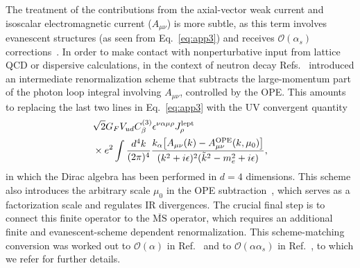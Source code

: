 \documentclass[prl,twocolumn,twoside,preprintnumbers,superscriptaddress,nofootinbib,letterpaper]{revtex4-1}
\newcommand{\Order}{\mathcal{O}}
\begin{document}
The treatment of the contributions  from  the axial-vector  weak current and  isoscalar electromagnetic current
($A_{\mu \nu}$) is more subtle, as this term  involves evanescent structures (as seen from Eq.~\eqref{eq:app3})
and receives $\Order(\alpha_s)$ corrections~\cite{Sirlin:1981ie,Gorbahn:2025ssv}.
In order to make contact with nonperturbative input from lattice QCD or  dispersive calculations,
in the context of neutron decay Refs.~\cite{Cirigliano:2023fnz,Gorbahn:2025ssv} introduced an intermediate renormalization
scheme that  subtracts  the large-momentum part of the photon loop integral
involving  $A_{\mu \nu}$,  controlled by the OPE.
This amounts to replacing the last two lines in  Eq.~\eqref{eq:app3}
with the  UV convergent quantity
\begin{align}
 &\sqrt{2} G_F V_{ud} C^{(3)}_\beta
  \epsilon^{\nu \alpha \mu \rho}         J_\rho^\text{lept}\notag\\
  &\times
  e^2 \int \frac{d^4 k}{(2 \pi)^4} \frac{ k_\alpha  \big[ A_{\mu \nu}  (k) - A_{\mu \nu}^\text{OPE} (k, \mu_0) \big] }{ (k^2 + i \epsilon)^2 (\tilde k^2-m_e^2 + i \epsilon)},
\end{align}
in which the Dirac algebra has  been performed in $d=4$ dimensions.
This scheme also  introduces the arbitrary scale $\mu_0$  in the OPE subtraction~\cite{Cirigliano:2023fnz},
which serves as a factorization scale and regulates IR divergences.
The crucial final step is to connect this finite operator to the  $\overline{\text{MS}}$ operator,
which  requires an additional finite and evanescent-scheme dependent renormalization.
This scheme-matching conversion was worked out to $\Order (\alpha)$ in Ref.~\cite{Cirigliano:2023fnz}
and to  $\Order (\alpha \alpha_s)$ in Ref.~\cite{Gorbahn:2025ssv}, to which we refer for further details.
\end{document}
